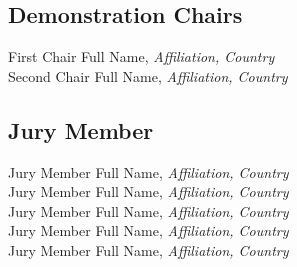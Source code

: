 
\subsection{Demonstration Chairs}
First Chair Full Name, \emph{Affiliation, Country}\\
Second Chair Full Name, \emph{Affiliation, Country}\\


\subsection{Jury Member}
Jury Member Full Name, \emph{Affiliation, Country}\\
Jury Member Full Name, \emph{Affiliation, Country}\\
Jury Member Full Name, \emph{Affiliation, Country}\\
Jury Member Full Name, \emph{Affiliation, Country}\\
Jury Member Full Name, \emph{Affiliation, Country}\\
